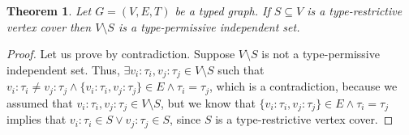 \documentclass[preprint,12pt]{elsarticle}
\theoremstyle{plain}
\newtheorem{theorem}{Theorem}[section]
\newcommand\tyv[2]{#1\!\!:\!\!#2}
\begin{document}
\begin{theorem}
Let $G = (V,E,T)$ be a typed graph.
If
$S\subseteq V$
is a type-restrictive vertex cover
then
$V\setminus S$
is a type-permissive independent set.
\end{theorem}
\begin{proof}
Let us prove by contradiction.
Suppose $V\setminus S$ is not a 
type-permissive independent set.
Thus,
$\exists \tyv{v_i}{\tau_i},\tyv{v_j}{\tau_j}\in V\setminus S$
such that
$\tyv{v_i}{\tau_i}\neq\tyv{v_j}{\tau_j} \wedge 
\{\tyv{v_i}{\tau_i},\tyv{v_j}{\tau_j}\}\in E \wedge \tau_i=\tau_j$,
which is a contradiction,
because we assumed that $\tyv{v_i}{\tau_i},\tyv{v_j}{\tau_j}\in V\setminus S$,
but we know that
$\{\tyv{v_i}{\tau_i},\tyv{v_j}{\tau_j}\}\in E \wedge \tau_i=\tau_j$
implies that
$\tyv{v_i}{\tau_i}\in S \vee \tyv{v_j}{\tau_j}\in S$,
since $S$ is a type-restrictive vertex cover.
\end{proof}
\end{document}
